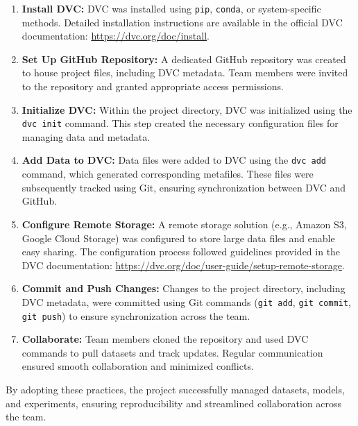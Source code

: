 \begin{enumerate}
	\item \textbf{Install DVC:} DVC was installed using \texttt{pip}, \texttt{conda}, or system-specific methods. Detailed installation instructions are available in the official DVC documentation: \url{https://dvc.org/doc/install}.
	
	\item \textbf{Set Up GitHub Repository:} A dedicated GitHub repository was created to house project files, including DVC metadata. Team members were invited to the repository and granted appropriate access permissions.
	
	\item \textbf{Initialize DVC:} Within the project directory, DVC was initialized using the \texttt{dvc init} command. This step created the necessary configuration files for managing data and metadata.
	
	\item \textbf{Add Data to DVC:} Data files were added to DVC using the \texttt{dvc add} command, which generated corresponding metafiles. These files were subsequently tracked using Git, ensuring synchronization between DVC and GitHub.
	
	\item \textbf{Configure Remote Storage:} A remote storage solution (e.g., Amazon S3, Google Cloud Storage) was configured to store large data files and enable easy sharing. The configuration process followed guidelines provided in the DVC documentation: \url{https://dvc.org/doc/user-guide/setup-remote-storage}.
	
	\item \textbf{Commit and Push Changes:} Changes to the project directory, including DVC metadata, were committed using Git commands (\texttt{git add}, \texttt{git commit}, \texttt{git push}) to ensure synchronization across the team.
	
	\item \textbf{Collaborate:} Team members cloned the repository and used DVC commands to pull datasets and track updates. Regular communication ensured smooth collaboration and minimized conflicts.
\end{enumerate}

By adopting these practices, the project successfully managed datasets, models, and experiments, ensuring reproducibility and streamlined collaboration across the team.
